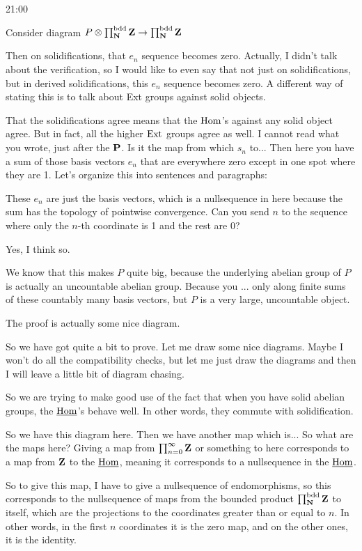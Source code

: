\begin{unfinished}{21:00}
\begin{sketch}
Consider diagram
$P \otimes \prod_\N^\bdd \Z \to \prod_\N^\bdd \Z$

%
Then on solidifications, that $e_n$ sequence becomes zero. Actually, I didn't talk about the verification, so I would like to even say that not just on solidifications, but in derived solidifications, this $e_n$ sequence becomes zero. A different way of stating this is to talk about Ext groups against solid objects.

%
That the solidifications agree means that the $\Hom$'s against any solid object agree. But in fact, all the higher $\Ext$ groups agree as well. I cannot read what you wrote, just after the $\P$. Is it the map from which $s_n$ to... Then here you have a sum of those basis vectors $e_n$ that are everywhere zero except in one spot where they are 1.
Let's organize this into sentences and paragraphs:

%
These $e_n$ are just the basis vectors, which is a nullsequence in here because the sum has the topology of pointwise convergence. Can you send $n$ to the sequence where only the $n$-th coordinate is 1 and the rest are 0?

Yes, I think so. 

We know that this makes $P$ quite big, because the underlying abelian group of $P$ is actually an uncountable abelian group. Because you ... only along finite sums of these countably many basis vectors, but $P$ is a very large, uncountable object.

The proof is actually some nice diagram.


So we have got quite a bit to prove. Let me draw some nice diagrams. 
Maybe I won't do all the compatibility checks, but let me just draw the diagrams and then I will leave a little bit of diagram chasing.

So we are trying to make good use of the fact that when you have solid abelian groups, the $\IntHom$'s behave well. In other words, they commute with solidification.

So we have this diagram here. Then we have another map which is... So what are the maps here? Giving a map from $\prod_{n=0}^\infty \Z$ or something to here corresponds to a map from $\Z$ to the $\IntHom$, meaning it corresponds to a nullsequence in the $\IntHom$. 

So to give this map, I have to give a nullsequence of endomorphisms, so this corresponds to the nullsequence of maps from the bounded product $\prod_\N^\bdd \Z$ to itself, which are the projections to the coordinates greater than or equal to $n$. 
In other words, in the first $n$ coordinates it is the zero map, and on the other ones, it is the identity.


\end{sketch}
\end{unfinished}
